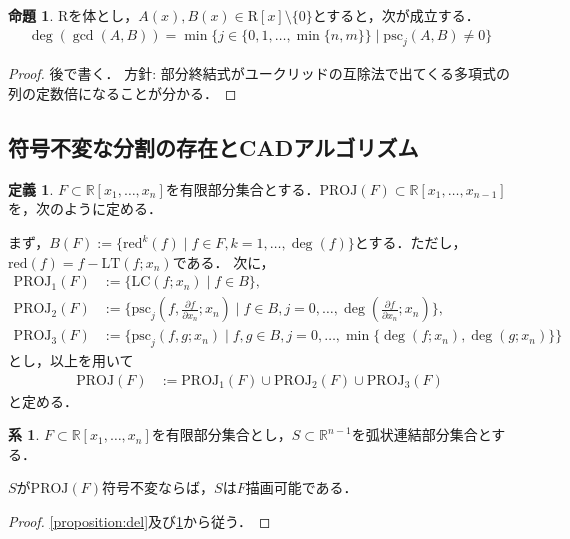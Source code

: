\documentclass[uplatex, dvipdfmx]{jsarticle}
\newcommand{\R}{\mathbb{R}}
\newcommand{\psc}{\mathrm{psc}}
\newcommand{\PROJ}{\mathrm{PROJ}}
\theoremstyle{definition}
\newtheorem{definition}{定義}[section]
\newtheorem{proposition}{命題}[section]
\newtheorem{corollary}{系}[section]
\begin{document}
\begin{proposition}\label{proposition:psc}
$\mathrm{R}$を体とし，$A(x), B(x) \in \mathrm{R}[x] \setminus \{0\}$とすると，次が成立する．
\begin{align*}
\deg(\gcd(A, B)) = \min \{ j  \in \{0,1, \dots, \min\{n,m\}\}\mid \psc_j(A,B) \neq 0\}
\end{align*}
\end{proposition}

\begin{proof}
後で書く．
方針: 部分終結式がユークリッドの互除法で出てくる多項式の列の定数倍になることが分かる．


\end{proof}


\subsection{符号不変な分割の存在とCADアルゴリズム}
\begin{definition}
$F \subset \R[x_1, \dots, x_n]$を有限部分集合とする．$\PROJ(F) \subset \R[x_1, \dots, x_{n-1}]$を，次のように定める．

まず，$B(F) := \{ \mathrm{red}^k(f) \mid f \in F, k=1, \dots, \deg(f) \}$とする．ただし，$\mathrm{red}(f) = f - \mathrm{LT}(f; x_n)$である．
次に，
\begin{align*}
	\PROJ_1(F) &:= \{\mathrm{LC}(f;x_n) \mid f \in B\},\\
	\PROJ_2(F) &:= \{\psc_j(f, \frac{\partial f}{\partial x_n}; x_n) \mid f \in B, j =0, \dots, \deg(\frac{\partial f}{\partial x_n};x_n) \},\\
	\PROJ_3(F) &:= \{\psc_j(f,g;x_n) \mid f,g \in B, j = 0, \dots, \min\{\deg(f;x_n), \deg(g;x_n)\}\}
\end{align*}
とし，以上を用いて
\begin{align*}
	\PROJ(F) &:= \PROJ_1(F) \cup \PROJ_2(F) \cup \PROJ_3(F)
\end{align*}
と定める．
\end{definition}
\begin{corollary}
$F \subset \R[x_1, \dots, x_n]$を有限部分集合とし，$S \subset \R^{n-1}$を弧状連結部分集合とする．

$S$が$\PROJ(F)$符号不変ならば，$S$は$F$描画可能である．
\end{corollary}

\begin{proof}
\cref{proposition:del}及び\cref{proposition:psc}から従う．
\end{proof}
\end{document}
